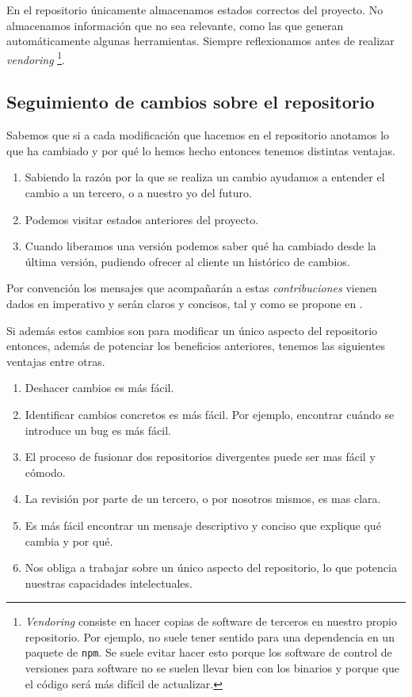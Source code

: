 En el repositorio únicamente almacenamos estados correctos del proyecto. No
almacenamos información que no sea relevante, como las que generan automáticamente
algunas herramientas. Siempre reflexionamos antes de realizar \textit{vendoring}%
\footnote{\textit{Vendoring} consiste en hacer copias de software de terceros en
nuestro propio repositorio. Por ejemplo, no suele tener sentido para una dependencia en
un paquete de \texttt{npm}. Se suele evitar hacer esto porque los software de control
de versiones para software no se suelen llevar bien con los binarios y porque que el código será
más difícil de actualizar.}.

\subsection{Seguimiento de cambios sobre el repositorio}

Sabemos que si a cada modificación que hacemos en el repositorio anotamos
lo que ha cambiado y por qué lo hemos hecho entonces tenemos distintas ventajas.

\begin{enumerate}
    \item Sabiendo la razón por la que se realiza un cambio ayudamos a entender
          el cambio a un tercero, o a nuestro yo del futuro.
    \item Podemos visitar estados anteriores del proyecto.
    \item Cuando liberamos una versión podemos saber qué ha cambiado desde la última
          versión, pudiendo ofrecer al cliente un histórico de cambios.
\end{enumerate}

Por convención los mensajes que acompañarán a estas \textit{contribuciones} vienen
dados en imperativo y serán claros y concisos, tal y como se propone en \cite[Commit Guidelines]{ProGIT}.

Si además estos cambios son para modificar un único aspecto del repositorio
entonces, además de potenciar los beneficios anteriores, tenemos las siguientes
ventajas entre otras.

\begin{enumerate}
    \item Deshacer cambios es más fácil.
    \item Identificar cambios concretos es más fácil. Por ejemplo, encontrar cuándo se introduce un bug
           es más fácil.
    \item El proceso de fusionar dos repositorios divergentes puede ser mas fácil y cómodo.
    \item La revisión por parte de un tercero, o por nosotros mismos, es mas clara.
    \item Es más fácil encontrar un mensaje descriptivo y conciso que explique qué cambia y por qué.
    \item Nos obliga a trabajar sobre un único aspecto del repositorio, lo que potencia nuestras
          capacidades intelectuales.
\end{enumerate}

